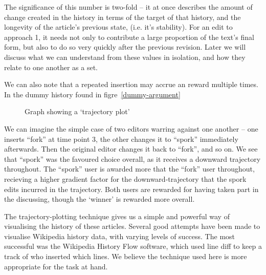 The significance of this number is two-fold -- it at once describes
the amount of change created in the history in terms of the target of
that history, and the longevity of the article's previous state,
(i.e. it's stability). For an edit to approach 1, it needs not only to
contribute a large proportion of the text's final form, but also to do
so very quickly after the previous revision. Later we will discuss
what we can understand from these values in isolation, and how they
relate to one another as a set. 

We can also note that a repeated insertion may accrue an reward
multiple times. In the dummy history found in figre~\ref{dummy-argument}

\begin{wrapfigure}{i}{0.4\textwidth}
  \centering
  \pgfplotsset{width=0.4\textwidth}
  \caption{Graph showing a `trajectory plot'}
  \label{fig:dummy-history}
\end{wrapfigure}

We can imagine the simple case of two editors warring against one
another -- one inserts ``fork'' at time point 3, the other changes it
to ``spork'' immediately afterwards. Then the original editor changes
it back to ``fork'', and so on. We see that ``spork'' was the favoured
choice overall, as it receives a downward trajectory throughout. The
``spork'' user is awarded more that the ``fork'' user throughout,
recieving a higher gradient factor for the downward-trajectory that
the spork edits incurred in the trajectory. Both users are rewarded
for having taken part in the discussing, though the `winner' is
rewarded more overall.

The trajectory-plotting technique gives us a simple and powerful way
of visualising the history of these articles. Several good attempts
have been made to visualise Wikipedia history data, with varying
levels of
success.\cite{Chi2008}\cite{Sabel2007}\cite{Suh2007}\cite{Wu2013}\cite{Viegas2004}
The most successful was the Wikipedia History Flow
software,\cite{iphylo-history}\cite{wiki-history-flow} which used line
diff to keep a track of who inserted which lines. We believe the
technique used here is more appropriate for the task at hand.

